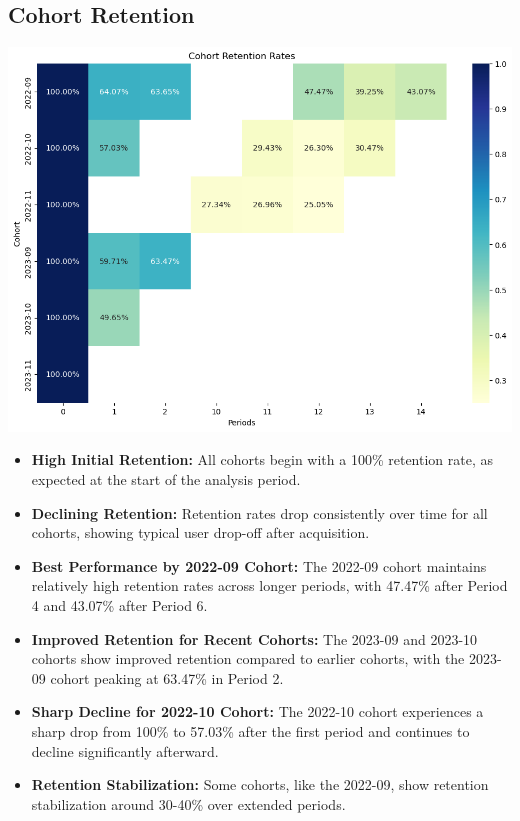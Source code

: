 \documentclass{article}
\begin{document}
    \subsection{Cohort Retention}
    \begin{center}
        \includegraphics[width=1\columnwidth]{images/cohort-retention.png}
    \end{center}
    \begin{itemize}
        \item \textbf{High Initial Retention:} All cohorts begin with a 100\% retention rate, as expected at the start of the analysis period.
        
        \item \textbf{Declining Retention:} Retention rates drop consistently over time for all cohorts, showing typical user drop-off after acquisition.
        
        \item \textbf{Best Performance by 2022-09 Cohort:} The 2022-09 cohort maintains relatively high retention rates across longer periods, with 47.47\% after Period 4 and 43.07\% after Period 6.
        
        \item \textbf{Improved Retention for Recent Cohorts:} The 2023-09 and 2023-10 cohorts show improved retention compared to earlier cohorts, with the 2023-09 cohort peaking at 63.47\% in Period 2.
        
        \item \textbf{Sharp Decline for 2022-10 Cohort:} The 2022-10 cohort experiences a sharp drop from 100\% to 57.03\% after the first period and continues to decline significantly afterward.
        
        \item \textbf{Retention Stabilization:} Some cohorts, like the 2022-09, show retention stabilization around 30-40\% over extended periods.
    \end{itemize}
    
\end{document}
